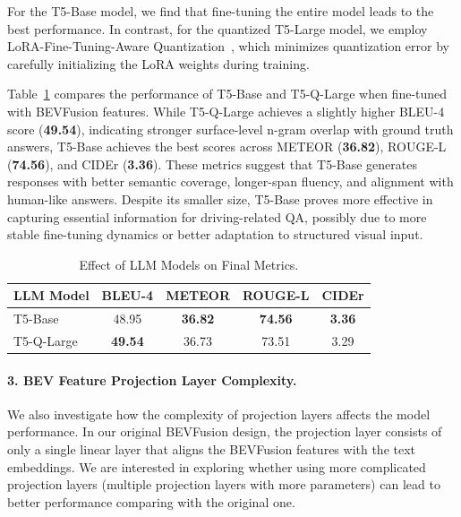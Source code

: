 \documentclass{article} %
\begin{document}
For the T5-Base model, we find that fine-tuning the entire model leads to the best performance. In contrast, for the quantized T5-Large model, we employ LoRA-Fine-Tuning-Aware Quantization~\cite{li2023loftq}, which minimizes quantization error by carefully initializing the LoRA weights during training.

Table~\ref{tab:llm-effect} compares the performance of T5-Base and T5-Q-Large when fine-tuned with BEVFusion features. While T5-Q-Large achieves a slightly higher BLEU-4 score (\textbf{49.54}), indicating stronger surface-level n-gram overlap with ground truth answers, T5-Base achieves the best scores across METEOR (\textbf{36.82}), ROUGE-L (\textbf{74.56}), and CIDEr (\textbf{3.36}). These metrics suggest that T5-Base generates responses with better semantic coverage, longer-span fluency, and alignment with human-like answers. Despite its smaller size, T5-Base proves more effective in capturing essential information for driving-related QA, possibly due to more stable fine-tuning dynamics or better adaptation to structured visual input.


\begin{table}[h]
    \centering
    \small
    \begin{tabular}{lcccc}
        \toprule
        \textbf{LLM Model} & \textbf{BLEU-4} & \textbf{METEOR} & \textbf{ROUGE-L} & \textbf{CIDEr} \\
        \midrule
T5-Base             & 48.95 & \textbf{36.82} & \textbf{74.56} & \textbf{3.36} \\
T5-Q-Large & \textbf{49.54} & 36.73          & 73.51          & 3.29\\
        \bottomrule
    \end{tabular}
    \caption{Effect of LLM Models on Final Metrics.}
    \label{tab:llm-effect}
\end{table}



\paragraph{3. BEV Feature Projection Layer Complexity.}

We also investigate how the complexity of projection layers affects the model performance. In our original BEVFusion design, the projection layer consists of only a single linear layer that aligns the BEVFusion features with the text embeddings. We are interested in exploring whether using more complicated projection layers (multiple projection layers with more parameters) can lead to better performance comparing with the original one.
\end{document}
